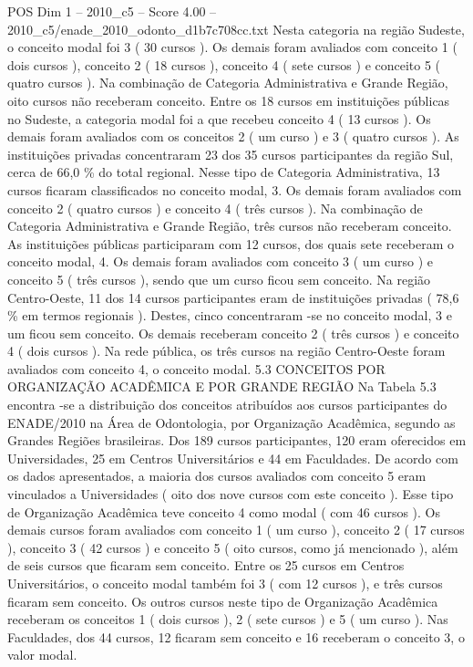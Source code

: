 \begin{textsample}{POS Dim 1 – 2010\_c5 – Score 4.00 – 2010\_c5/enade\_2010\_odonto\_d1b7c708cc.txt}
Nesta categoria na região Sudeste, o conceito modal foi 3 ( 30 cursos ).
Os demais foram avaliados com conceito 1 ( dois cursos ), conceito 2 ( 18 cursos ), conceito 4 ( sete cursos ) e conceito 5 ( quatro cursos ).
Na combinação de Categoria Administrativa e Grande Região, oito cursos não receberam conceito.
Entre os 18 cursos em instituições públicas no Sudeste, a categoria modal foi a que recebeu conceito 4 ( 13 cursos ).
Os demais foram avaliados com os conceitos 2 ( um curso ) e 3 ( quatro cursos ).
As instituições privadas concentraram 23 dos 35 cursos participantes da região Sul, cerca de 66,0 \% do total regional.
Nesse tipo de Categoria Administrativa, 13 cursos ficaram classificados no conceito modal, 3.
Os demais foram avaliados com conceito 2 ( quatro cursos ) e conceito 4 ( três cursos ).
Na combinação de Categoria Administrativa e Grande Região, três cursos não receberam conceito.
As instituições públicas participaram com 12 cursos, dos quais sete receberam o conceito modal, 4.
Os demais foram avaliados com conceito 3 ( um curso ) e conceito 5 ( três cursos ), sendo que um curso ficou sem conceito.
Na região Centro-Oeste, 11 dos 14 cursos participantes eram de instituições privadas ( 78,6 \% em termos regionais ).
Destes, cinco concentraram -se no conceito modal, 3 e um ficou sem conceito.
Os demais receberam conceito 2 ( três cursos ) e conceito 4 ( dois cursos ).
Na rede pública, os três cursos na região Centro-Oeste foram avaliados com conceito 4, o conceito modal. 5.3 CONCEITOS POR ORGANIZAÇÃO ACADÊMICA E POR GRANDE REGIÃO Na Tabela 5.3 encontra -se a distribuição dos conceitos atribuídos aos cursos participantes do ENADE/2010 na Área de Odontologia, por Organização Acadêmica, segundo as Grandes Regiões brasileiras.
Dos 189 cursos participantes, 120 eram oferecidos em Universidades, 25 em Centros Universitários e 44 em Faculdades.
De acordo com os dados apresentados, a maioria dos cursos avaliados com conceito 5 eram vinculados a Universidades ( oito dos nove cursos com este conceito ).
Esse tipo de Organização Acadêmica teve conceito 4 como modal ( com 46 cursos ).
Os demais cursos foram avaliados com conceito 1 ( um curso ), conceito 2 ( 17 cursos ), conceito 3 ( 42 cursos ) e conceito 5 ( oito cursos, como já mencionado ), além de seis cursos que ficaram sem conceito.
Entre os 25 cursos em Centros Universitários, o conceito modal também foi 3 ( com 12 cursos ), e três cursos ficaram sem conceito.
Os outros cursos neste tipo de Organização Acadêmica receberam os conceitos 1 ( dois cursos ), 2 ( sete cursos ) e 5 ( um curso ).
Nas Faculdades, dos 44 cursos, 12 ficaram sem conceito e 16 receberam o conceito 3, o valor modal.

\end{textsample}
